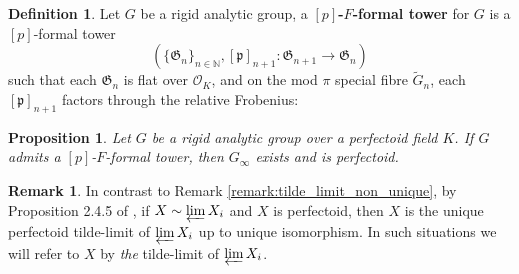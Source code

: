 \documentclass[10pt,oneside]{amsart}
\newtheorem{proposition}[theorem]{Proposition}
\theoremstyle{definition}
\newtheorem{definition}[theorem]{Definition}
\newtheorem{remark}[theorem]{Remark}
\begin{document}
	\begin{definition}
		Let $G$ be a rigid analytic group, a \textbf{$[p]$-$F$-formal tower} for $G$ is a $[p]$-formal tower 
		$$(\{\mathfrak G_n\}_{n\in \mathbb N}, [\mathfrak p]_{n+1}:\mathfrak G_{n+1}\rightarrow \mathfrak G_{n})$$ such that each $\mathfrak G_n$ is flat over $\mathcal O_K$, and on the mod $\pi$ special fibre  $\tilde{G}_n$, each   $[\mathfrak p]_{n+1}$ factors through the relative Frobenius:
				\begin{center}
				\end{center}
	 
	\end{definition}	
	
	 	\begin{proposition}\label{existence of p-F-formal tower implies perfectoid}
		Let $G$ be a rigid analytic group over a perfectoid field $K$. If $G$ admits a $[p]$-$F$-formal tower, then $G_\infty$ exists and is perfectoid. 
	\end{proposition}
	 
	\begin{remark} \label{remark:tilde_limit_unique}
In contrast to Remark \ref{remark:tilde_limit_non_unique}, by Proposition 2.4.5 of \cite{SW}, if $X \sim \varprojlim X_i$ and $X$ is perfectoid, then $X$ is the unique perfectoid tilde-limit of $ \varprojlim X_i$ up to unique isomorphism. In such situations we will refer to $X$ by \textit{the} tilde-limit of $ \varprojlim X_i$. 
	\end{remark} 
	 
\end{document}
